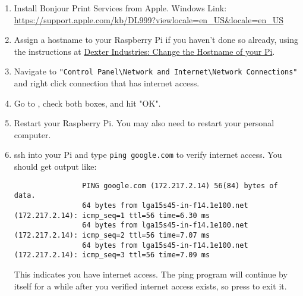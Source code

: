 \documentclass{article}
\begin{document}
		\begin{enumerate}
			\item Install Bonjour Print Services from Apple.
			\subitem Windows Link: \url{https://support.apple.com/kb/DL999?viewlocale=en_US&locale=en_US}
			\item Assign a hostname to your Raspberry Pi if you haven't done so already, using the instructions at \href{http://www.dexterindustries.com/howto/change-the-hostname-of-your-pi/}{Dexter Industries: Change the Hostname of your Pi}. 
			\item Navigate to \verb+"Control Panel\Network and Internet\Network Connections"+ and right click connection that has internet access.
			\item Go to , check both boxes, and hit "OK". 
			\item Restart your Raspberry Pi. You may also need to restart your personal computer.
			\item ssh into your Pi and type \verb|ping google.com| to verify internet access. You should get output like:
			\begin{verbatim}
				PING google.com (172.217.2.14) 56(84) bytes of data.
				64 bytes from lga15s45-in-f14.1e100.net (172.217.2.14): icmp_seq=1 ttl=56 time=6.30 ms
				64 bytes from lga15s45-in-f14.1e100.net (172.217.2.14): icmp_seq=2 ttl=56 time=7.07 ms
				64 bytes from lga15s45-in-f14.1e100.net (172.217.2.14): icmp_seq=3 ttl=56 time=7.09 ms
			\end{verbatim}
			This indicates you have internet access. The ping program will continue by itself for a while after you verified internet access exists, so press  to exit it.
		\end{enumerate}
		
\end{document}
